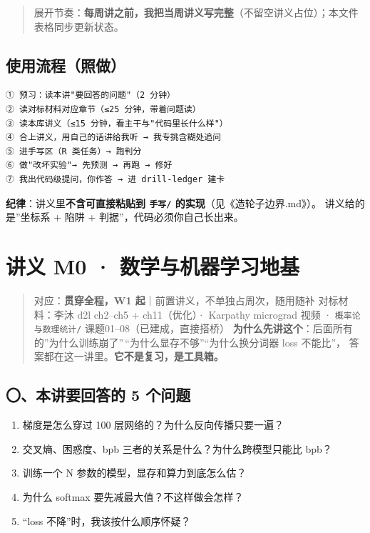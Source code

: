 \documentclass[
  chinese,
  11pt,
]{ctexart}
\providecommand{\tightlist}{%
  \setlength{\itemsep}{0pt}\setlength{\parskip}{0pt}}
\begin{document}
\begin{quote}
展开节奏：\textbf{每周讲之前，我把当周讲义写完整}（不留空讲义占位）；本文件表格同步更新状态。
\end{quote}

\subsection{使用流程（照做）}\label{ux4f7fux7528ux6d41ux7a0bux7167ux505a}

\begin{verbatim}
① 预习：读本讲"要回答的问题"（2 分钟）
② 读对标材料对应章节（≤25 分钟，带着问题读）
③ 读本库讲义（≤15 分钟，看主干与"代码里长什么样"）
④ 合上讲义，用自己的话讲给我听 → 我专挑含糊处追问
⑤ 进手写区（R 类任务）→ 跑判分
⑥ 做"改坏实验"→ 先预测 → 再跑 → 修好
⑦ 我出代码级提问，你作答 → 进 drill-ledger 建卡
\end{verbatim}

\textbf{纪律}：讲义里\textbf{不含可直接粘贴到 \texttt{手写/} 的实现}（见《造轮子边界.md》）。 讲义给的是''坐标系 + 陷阱 + 判据''，代码必须你自己长出来。

\newpage

\section{讲义 M0 · 数学与机器学习地基}\label{ux8bb2ux4e49-m0-ux6570ux5b66ux4e0eux673aux5668ux5b66ux4e60ux5730ux57fa}

\begin{quote}
对应：\textbf{贯穿全程，W1 起}｜前置讲义，不单独占周次，随用随补 对标材料：李沐 d2l ch2--ch5 + ch11（优化）· Karpathy micrograd 视频 · \texttt{概率论与数理统计/} 课题01--08（已建成，直接搭桥） \textbf{为什么先讲这个}：后面所有的''为什么训练崩了''\,``为什么显存不够''``为什么换分词器 loss 不能比''， 答案都在这一讲里。\textbf{它不是复习，是工具箱。}
\end{quote}

\subsection{〇、本讲要回答的 5 个问题}\label{ux672cux8bb2ux8981ux56deux7b54ux7684-5-ux4e2aux95eeux9898}

\begin{enumerate}
\def\labelenumi{\arabic{enumi}.}
\tightlist
\item
  梯度是怎么穿过 100 层网络的？为什么反向传播只要一遍？
\item
  交叉熵、困惑度、bpb 三者的关系是什么？为什么跨模型只能比 bpb？
\item
  训练一个 N 参数的模型，显存和算力到底怎么估？
\item
  为什么 softmax 要先减最大值？不这样做会怎样？
\item
  ``loss 不降''时，我该按什么顺序怀疑？
\end{enumerate}
\end{document}

